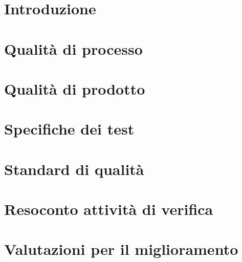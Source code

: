 \documentclass{article}
\begin{document}


\newpage
\section{Introduzione}%
\label{sec:introduzione}


\newpage
\section{Qualità di processo}%
\label{sec:qualita_di_processo}


\newpage
\section{Qualità di prodotto}%
\label{sec:qualita_di_prodotto}


\newpage
\section{Specifiche dei test}%
\label{sec:qualita_di_prodotto}


\appendix
\newpage
\section{Standard di qualità}%
\label{sec:standard_di_qualita}


\newpage
\section{Resoconto attività di verifica}%
\label{sec:resoconto_attivita_di_verifica}


\newpage
\section{Valutazioni per il miglioramento}%
\label{sec:valutazioni_per_il_miglioramento}

\end{document}
